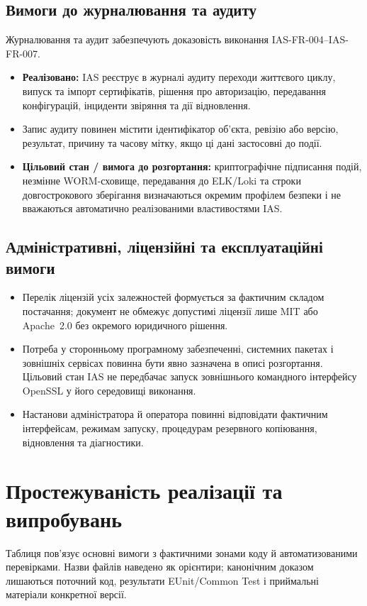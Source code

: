 \documentclass{article}
\begin{document}
\subsection{Вимоги до журналювання та аудиту}
Журналювання та аудит забезпечують доказовість виконання IAS-FR-004--IAS-FR-007.
\begin{itemize}
    \item \textbf{Реалізовано:} IAS реєструє в журналі аудиту переходи життєвого циклу, випуск та імпорт сертифікатів, рішення про авторизацію, передавання конфігурацій, інциденти звіряння та дії відновлення.
    \item Запис аудиту повинен містити ідентифікатор об'єкта, ревізію або версію, результат, причину та часову мітку, якщо ці дані застосовні до події.
    \item \textbf{Цільовий стан / вимога до розгортання:} криптографічне підписання подій, незмінне WORM-сховище, передавання до ELK/Loki та строки довгострокового зберігання визначаються окремим профілем безпеки і не вважаються автоматично реалізованими властивостями IAS.
\end{itemize}

\subsection{Адміністративні, ліцензійні та експлуатаційні вимоги}
\begin{itemize}
    \item Перелік ліцензій усіх залежностей формується за фактичним складом постачання; документ не обмежує допустимі ліцензії лише MIT або Apache~2.0 без окремого юридичного рішення.
    \item Потреба у сторонньому програмному забезпеченні, системних пакетах і зовнішніх сервісах повинна бути явно зазначена в описі розгортання. Цільовий стан IAS не передбачає запуск зовнішнього командного інтерфейсу OpenSSL у його середовищі виконання.
    \item Настанови адміністратора й оператора повинні відповідати фактичним інтерфейсам, режимам запуску, процедурам резервного копіювання, відновлення та діагностики.
\end{itemize}


\section{Простежуваність реалізації та випробувань}
Таблиця пов'язує основні вимоги з фактичними зонами коду й автоматизованими перевірками. Назви файлів наведено як орієнтири; канонічним доказом лишаються поточний код, результати EUnit/Common Test і приймальні матеріали конкретної версії.
\end{document}
